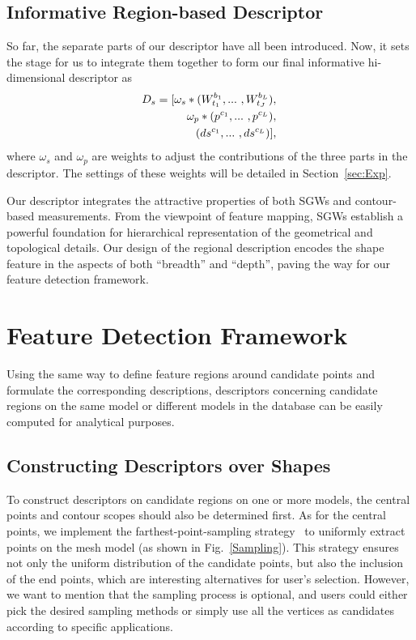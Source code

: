 \subsection{Informative Region-based Descriptor}

So far, the separate parts of our descriptor have all been introduced.
Now, it sets the stage for us to integrate them together to form our
final informative hi-dimensional descriptor as
\begin{equation}
\label{eq:desFinal}
\begin{aligned}
  \hspace{-0.5mm}
  D_s =  [\omega_s*(W_{t_1}^{b_1},...\ ,W_{t_J}^{b_L}),\\
  \omega_p*(p^{c_1},...\ ,p^{c_L}),\\
  (ds^{c_1},...\ ,ds^{c_L})],
\end{aligned}
\end{equation}
where $\omega_s$ and $\omega_p$ are weights to adjust the
contributions of the three parts in the descriptor. The settings of
these weights will be detailed in Section~\ref{sec:Exp}.

Our descriptor integrates the attractive properties of both SGWs and
contour-based measurements. From the viewpoint of feature mapping,
SGWs establish a powerful foundation for hierarchical representation
of the geometrical and topological details. Our design of the
regional description encodes the shape feature in the aspects of both
``breadth'' and ``depth'', paving the way for our feature detection
framework.

\section{Feature Detection Framework}
\label{sec:Framework}

Using the same way to define feature regions around candidate points
and formulate the corresponding descriptions, descriptors concerning
candidate regions on the same model or different models in the
database can be easily computed for analytical purposes.

\subsection{Constructing Descriptors over Shapes}

To construct descriptors on candidate regions on one or more models,
the central points and contour scopes should also be determined first.
As for the central points, we implement the farthest-point-sampling
strategy~\cite{Moenning:2003} to uniformly extract points on the mesh
model (as shown in Fig.~\ref{Sampling}). This strategy ensures not
only the uniform distribution of the candidate points, but also the
inclusion of the end points, which are interesting alternatives for
user's selection. However, we want to mention that the sampling
process is optional, and users could either pick the desired sampling
methods or simply use all the vertices as candidates according to
specific applications.

